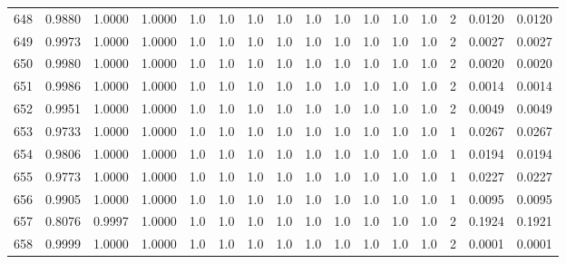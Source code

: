 \begin{tabular}{lrrrrrrrrrrrrrrr}
648 &      0.9880 &  1.0000 &  1.0000 &     1.0 &     1.0 &     1.0 &     1.0 &     1.0 &     1.0 &     1.0 &      1.0 &        1.0 &      2 &                    0.0120 &                     0.0120 \\
649 &      0.9973 &  1.0000 &  1.0000 &     1.0 &     1.0 &     1.0 &     1.0 &     1.0 &     1.0 &     1.0 &      1.0 &        1.0 &      2 &                    0.0027 &                     0.0027 \\
650 &      0.9980 &  1.0000 &  1.0000 &     1.0 &     1.0 &     1.0 &     1.0 &     1.0 &     1.0 &     1.0 &      1.0 &        1.0 &      2 &                    0.0020 &                     0.0020 \\
651 &      0.9986 &  1.0000 &  1.0000 &     1.0 &     1.0 &     1.0 &     1.0 &     1.0 &     1.0 &     1.0 &      1.0 &        1.0 &      2 &                    0.0014 &                     0.0014 \\
652 &      0.9951 &  1.0000 &  1.0000 &     1.0 &     1.0 &     1.0 &     1.0 &     1.0 &     1.0 &     1.0 &      1.0 &        1.0 &      2 &                    0.0049 &                     0.0049 \\
653 &      0.9733 &  1.0000 &  1.0000 &     1.0 &     1.0 &     1.0 &     1.0 &     1.0 &     1.0 &     1.0 &      1.0 &        1.0 &      1 &                    0.0267 &                     0.0267 \\
654 &      0.9806 &  1.0000 &  1.0000 &     1.0 &     1.0 &     1.0 &     1.0 &     1.0 &     1.0 &     1.0 &      1.0 &        1.0 &      1 &                    0.0194 &                     0.0194 \\
655 &      0.9773 &  1.0000 &  1.0000 &     1.0 &     1.0 &     1.0 &     1.0 &     1.0 &     1.0 &     1.0 &      1.0 &        1.0 &      1 &                    0.0227 &                     0.0227 \\
656 &      0.9905 &  1.0000 &  1.0000 &     1.0 &     1.0 &     1.0 &     1.0 &     1.0 &     1.0 &     1.0 &      1.0 &        1.0 &      1 &                    0.0095 &                     0.0095 \\
657 &      0.8076 &  0.9997 &  1.0000 &     1.0 &     1.0 &     1.0 &     1.0 &     1.0 &     1.0 &     1.0 &      1.0 &        1.0 &      2 &                    0.1924 &                     0.1921 \\
658 &      0.9999 &  1.0000 &  1.0000 &     1.0 &     1.0 &     1.0 &     1.0 &     1.0 &     1.0 &     1.0 &      1.0 &        1.0 &      2 &                    0.0001 &                     0.0001 \\

\end{tabular}
